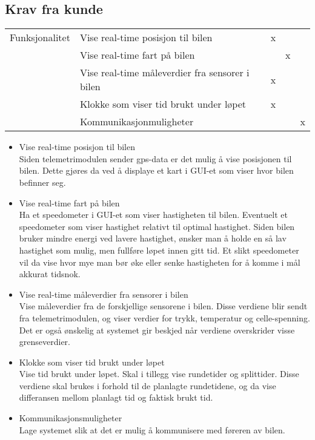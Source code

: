 \subsection{Krav fra kunde}
\begin{tabular}{|r|l|l|l|l|} 
    \hline 
        Funksjonalitet  & Vise real-time posisjon til bilen & x &   & \\ \cline{2-5} 
                & Vise real-time fart på bilen &  & x  & \\ \cline{2-5} 
                & Vise real-time måleverdier fra sensorer i bilen & x &   & \\ \cline{2-5} 
                & Klokke som viser tid brukt under løpet   &  x &  & \\ \cline{2-5} 
                & Kommunikasjonmuligheter &  &   & x \\ \hline 
         \end{tabular}
\begin{itemize}
\item Vise real-time posisjon til bilen \\
Siden telemetrimodulen sender gps-data er det mulig  å vise posisjonen til bilen. Dette gjøres da ved å displaye et kart i GUI-et som viser hvor bilen befinner seg.
\item Vise real-time fart på bilen \\
Ha et speedometer i GUI-et som viser hastigheten til bilen. Eventuelt et speedometer som viser hastighet relativt til optimal hastighet. Siden bilen bruker mindre energi ved lavere hastighet, ønsker man å holde en så lav hastighet som mulig, men fullføre løpet innen gitt tid. Et slikt speedometer vil da vise hvor mye man bør øke eller senke hastigheten for å komme i mål akkurat tidsnok.
\item  Vise real-time måleverdier fra sensorer i bilen \\
Vise måleverdier fra de forskjellige sensorene i bilen. Disse verdiene blir sendt fra telemetrimodulen, og viser verdier for trykk, temperatur og celle-spenning. Det er også ønskelig at systemet gir beskjed når verdiene overskrider visse grenseverdier. 
\item Klokke som viser tid brukt under løpet \\
Vise tid brukt under løpet. Skal i tillegg vise rundetider og splittider. Disse verdiene skal brukes i forhold til de planlagte rundetidene, og da vise differansen mellom planlagt tid og faktisk brukt tid. 
\item Kommunikasjonsmuligheter \\
Lage systemet slik at det er mulig å kommunisere med føreren av bilen.
\end{itemize}
